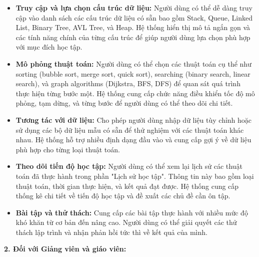 \begin{itemize}
\item \textbf{Truy cập và lựa chọn cấu trúc dữ liệu:} Người dùng có thể dễ dàng truy cập vào danh sách các cấu trúc dữ liệu có sẵn bao gồm Stack, Queue, Linked List, Binary Tree, AVL Tree, và Heap. Hệ thống hiển thị mô tả ngắn gọn và các tính năng chính của từng cấu trúc để giúp người dùng lựa chọn phù hợp với mục đích học tập.

\item \textbf{Mô phỏng thuật toán:} Người dùng có thể chọn các thuật toán cụ thể như sorting (bubble sort, merge sort, quick sort), searching (binary search, linear search), và graph algorithms (Dijkstra, BFS, DFS) để quan sát quá trình thực hiện từng bước một. Hệ thống cung cấp chức năng điều khiển tốc độ mô phỏng, tạm dừng, và từng bước để người dùng có thể theo dõi chi tiết.

\item \textbf{Tương tác với dữ liệu:} Cho phép người dùng nhập dữ liệu tùy chỉnh hoặc sử dụng các bộ dữ liệu mẫu có sẵn để thử nghiệm với các thuật toán khác nhau. Hệ thống hỗ trợ nhiều định dạng đầu vào và cung cấp gợi ý về dữ liệu phù hợp cho từng loại thuật toán.

\item \textbf{Theo dõi tiến độ học tập:} Người dùng có thể xem lại lịch sử các thuật toán đã thực hành trong phần "Lịch sử học tập". Thông tin này bao gồm loại thuật toán, thời gian thực hiện, và kết quả đạt được. Hệ thống cung cấp thống kê chi tiết về tiến độ học tập và đề xuất các chủ đề cần ôn tập.

\item \textbf{Bài tập và thử thách:} Cung cấp các bài tập thực hành với nhiều mức độ khó khăn từ cơ bản đến nâng cao. Người dùng có thể giải quyết các thử thách lập trình và nhận phản hồi tức thì về kết quả của mình.
\end{itemize}

\textbf{2. Đối với Giảng viên và giáo viên:}

